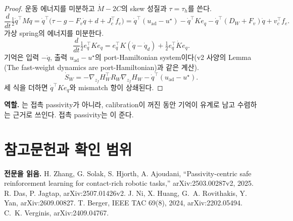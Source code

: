 \documentclass[11pt]{article}\usepackage[margin=1in]{geometry}\usepackage{amsmath,amssymb,amsthm,mathtools}\usepackage{graphicx}\graphicspath{{figures/}{../figures/}{figs/}{./}}\usepackage{enumitem}\usepackage{hyperref}\usepackage{cleveref}\usepackage{tikz}\usetikzlibrary{arrows.meta,positioning,calc,shapes.geometric}\usepackage{float}\usepackage{rotating}\usepackage[most]{tcolorbox}\usepackage{kotex}\usepackage{booktabs}\usepackage{longtable}\emergencystretch=1.6em\tolerance=2000 \crefname{assumption}{Assumption}{Assumptions}\Crefname{assumption}{Assumption}{Assumptions}\crefname{definition}{Definition}{Definitions}\Crefname{definition}{Definition}{Definitions}\crefname{proposition}{Proposition}{Propositions}\Crefname{proposition}{Proposition}{Propositions}\crefname{fact}{Fact}{Facts}\Crefname{fact}{Fact}{Facts} \newtheorem{assumption}{Assumption}\newtheorem{definition}{Definition}\newtheorem{lemma}{Lemma}\newtheorem{proposition}{Proposition}\newtheorem{theorem}{Theorem}\newtheorem{corollary}{Corollary}\newtheorem{fact}{Fact}\theoremstyle{remark}\newtheorem{remark}{Remark} \newcommand{\R}{\mathbb{R}}\newcommand{\xb}{\bar x}\newcommand{\Ab}{\bar A}\newcommand{\By}{\bar B_y}\newcommand{\U}{\mathcal U}\newcommand{\Z}{\mathcal Z}
\begin{document}
\begin{proof}
운동 에너지를 미분하고 $\dot M-2C$의 skew 성질과 $\tau=\tau_h$를 쓴다.
\[
\frac{d}{dt}\tfrac12\dot q^\top M\dot q=\dot q^\top\big(\tau-g-F_v\dot q+d+J_c^\top f_e\big)=\dot q^\top(u_{\mathrm{ad}}-u^\star)-\dot q^\top Ke_q-\dot q^\top(D_W+F_v)\dot q+v_c^\top f_e .
\]
가상 spring의 에너지를 미분한다.
\[
\frac{d}{dt}\tfrac12e_q^\top Ke_q=e_q^\top K(\dot q-\dot q_d)+\tfrac12e_q^\top\dot Ke_q .
\]
기억은 입력 $-\dot q$, 출력 $u_{\mathrm{ad}}-u^\star$의 port-Hamiltonian system이다(v2 사양의 Lemma (The fast-weight dynamics are port-Hamiltonian)과 같은 계산).
\[
\dot S_W=-\nabla_{z_f}H_W^\top R_W\nabla_{z_f}H_W-\dot q^\top(u_{\mathrm{ad}}-u^\star) .
\]
세 식을 더하면 $\dot q^\top Ke_q$와 mismatch 항이 상쇄된다.
\end{proof}

\textbf{역할.} 는 접촉 passivity가 아니라, calibration이 꺼진 동안 기억이 유계로 남고 수렴하는 근거로 쓰인다. 접촉 passivity는 이 준다.

\section{참고문헌과 확인 범위}
\label{app:refs3}

\textbf{전문을 읽음.} H. Zhang, G. Solak, S. Hjorth, A. Ajoudani, ``Passivity-centric safe reinforcement learning for contact-rich robotic tasks,'' arXiv:2503.00287v2, 2025. R. Das, P. Jagtap, arXiv:2507.01426v2. J. Ni, X. Huang, G.~A. Rovithakis, Y. Yan, arXiv:2609.00827. T. Berger, IEEE TAC 69(8), 2024, arXiv:2202.05494. C.~K. Verginis, arXiv:2409.04767.
\end{document}
